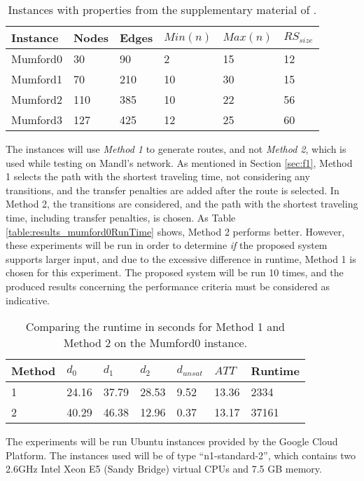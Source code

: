 \begin{table}[H]
	\centering
	\begin{tabular}{|l|l|l|l|l|l|}
    	\hline
    	\textbf{Instance} & \textbf{Nodes}&\textbf{Edges} & $Min(n)$ & $Max(n)$ & $RS_{size}$\\
    	\hline
   	    Mumford0 & 30&90 & 2&15 & 12 \\
   	    Mumford1 & 70&210 & 10&30 & 15 \\
   	    Mumford2 & 110&385 & 10&22 & 56 \\
   	    Mumford3 & 127&425 & 12&25 & 60 \\
   	    \hline
    \end{tabular}
    \caption{Instances with properties from the supplementary material of \citet{mumford13}.}
    \label{table:dataSet_mumford}
\end{table}

The instances will use \textit{Method 1} to generate routes, and not \textit{Method 2}, which is used while testing on Mandl's network. As mentioned in Section \vref{sec:f1}, Method 1 selects the path with the shortest traveling time, not considering any transitions, and the transfer penalties are added after the route is selected. In Method 2, the transitions are considered, and the path with the shortest traveling time, including transfer penalties, is chosen. As Table \vref{table:results_mumford0RunTime} shows, Method 2 performs better. However, these experiments will be run in order to determine \textit{if} the proposed system supports larger input, and due to the excessive difference in runtime, Method 1 is chosen for this experiment. The proposed system will be run 10 times, and the produced results concerning the performance criteria must be considered as indicative. 

\begin{table}[H]
    \centering
    \begin{tabular}{|l|l|l|l|l|l|l|}
        \hline
        \textbf{Method} & $d_0$ & $d_1$ & $d_2$ & $d_{unsat}$ & $ATT$ & \textbf{Runtime} \\
        \hline
        1 & 24.16 & 37.79 & 28.53 & 9.52 & 13.36 & 2334 \\
        2 & 40.29 & 46.38 & 12.96 & 0.37 & 13.17 & 37161 \\
        \hline
    \end{tabular}
    \caption{Comparing the runtime in seconds for Method 1 and Method 2 on the Mumford0 instance.}
    \label{table:results_mumford0RunTime}
\end{table}

The experiments will be run Ubuntu instances provided by the Google Cloud Platform\citep{website:google}. The instances used will be of type ``n1-standard-2'', which contains two 2.6GHz Intel Xeon E5 (Sandy Bridge) virtual CPUs and 7.5 GB memory.
